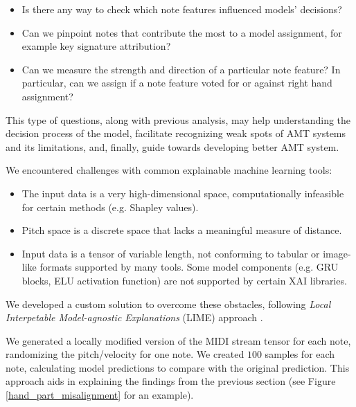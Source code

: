 \begin{itemize}
	\item Is there any way to check which note features influenced models' decisions?
	\item Can we pinpoint notes that contribute the most to a model assignment, for example key signature attribution?
	\item Can we measure the strength and direction of a particular note feature? In particular, can we assign if a note feature voted for or against right hand assignment?
\end{itemize}

This type of questions, along with previous analysis, may help understanding the decision process of the model, facilitate recognizing weak spots of AMT systems and its limitations, and, finally, guide towards developing better AMT system.

We encountered challenges with common explainable machine learning tools: 

\begin{itemize}
	\item The input data is a very high-dimensional space, computationally infeasible for certain methods (e.g. Shapley values).
	\item Pitch space is a discrete space that lacks a meaningful measure of distance.
	\item Input data is a tensor of variable length, not conforming to tabular or image-like formats supported by many tools. Some model components (e.g. GRU blocks, ELU activation function) are not supported by certain XAI libraries. \missing
\end{itemize} 

We developed a custom solution to overcome these obstacles, following \emph{Local Interpetable Model-agnostic Explanations} (LIME) approach \cite{Ribeiro2016}.

We generated a locally modified version of the MIDI stream tensor for each note, randomizing the pitch/velocity for one note. We created $100$ samples for each note, calculating model predictions to compare with the original prediction. This approach aids in explaining the findings from the previous section (see Figure \ref{hand_part_misalignment} for an example).

